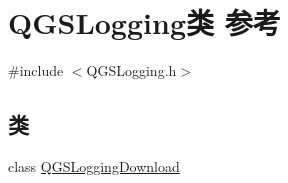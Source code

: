 \hypertarget{class_q_g_s_logging}{}\section{Q\+G\+S\+Logging类 参考}
\label{class_q_g_s_logging}


{\ttfamily \#include $<$Q\+G\+S\+Logging.\+h$>$}

\subsection*{类}
\begin{DoxyCompactItemize}
\item 
class \mbox{\hyperlink{class_q_g_s_logging_1_1_q_g_s_logging_download}{Q\+G\+S\+Logging\+Download}}
\end{DoxyCompactItemize}
